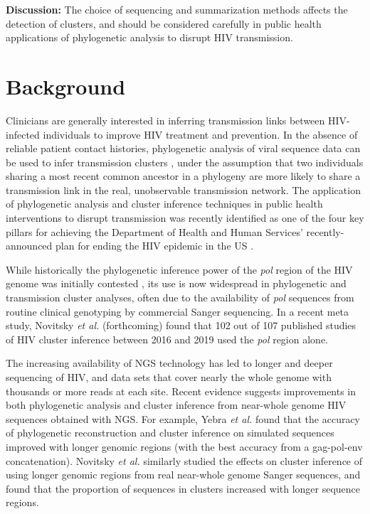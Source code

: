 \documentclass[letterpaper]{article}
\begin{document}
\textbf{Discussion:} The choice of sequencing and summarization methods affects the detection of clusters, and should be considered carefully in public health applications of phylogenetic analysis to disrupt HIV transmission.

\section*{Background}

Clinicians are generally interested in inferring transmission links between HIV-infected individuals to improve HIV treatment and prevention. In the absence of reliable patient contact histories, phylogenetic analysis of viral sequence data can be used to infer transmission clusters \parencite{leitner}, under the assumption that two individuals sharing a most recent common ancestor in a phylogeny are more likely to share a transmission link in the real, unobservable transmission network. The application of phylogenetic analysis and cluster inference techniques in public health interventions to disrupt transmission was recently identified as one of the four key pillars for achieving the Department of Health and Human Services' recently-announced plan for ending the HIV epidemic in the US \parencite{fauci}.

While historically the phylogenetic inference power of the \emph{pol} region of the HIV genome was initially contested \parencite{hue, sturmer}, its use is now widespread in phylogenetic and transmission cluster analyses, often due to the availability of \emph{pol} sequences from routine clinical genotyping by commercial Sanger sequencing. In a recent meta study, Novitsky \emph{et al.} (forthcoming) found that 102 out of 107 published studies of HIV cluster inference between 2016 and 2019 used the \emph{pol} region alone.

The increasing availability of NGS technology has led to longer and deeper sequencing of HIV, and data sets that cover nearly the whole genome with thousands or more reads at each site. Recent evidence suggests improvements in both phylogenetic analysis and cluster inference from near-whole genome HIV sequences obtained with NGS. For example, Yebra \emph{et al.} \parencite{yebra} found that the accuracy of phylogenetic reconstruction and cluster inference on simulated sequences improved with longer genomic regions (with the best accuracy from a gag-pol-env concatenation). Novitsky \emph{et al.} \parencite{novitsky} similarly studied the effects on cluster inference of using longer genomic regions from real near-whole genome Sanger sequences, and found that the proportion of sequences in clusters increased with longer sequence regions.
\end{document}
